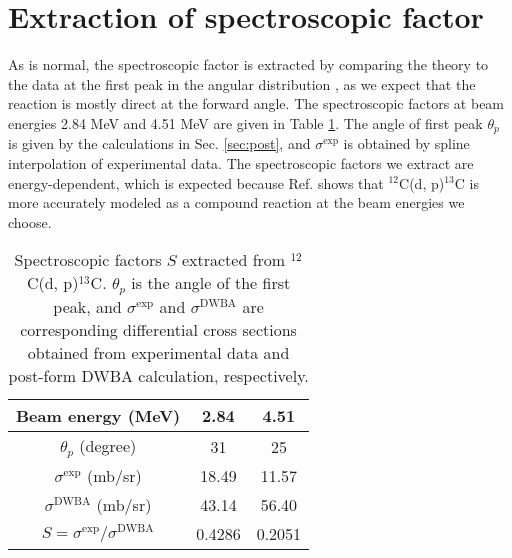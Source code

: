 \section{Extraction of spectroscopic factor}
As is normal, the spectroscopic factor is extracted by comparing the theory to the data at the first peak in the angular distribution
\cite{PhysRevC.69.064313}, as we expect that the reaction is mostly direct at the forward angle. 
The spectroscopic factors at beam energies 2.84 MeV and 4.51 MeV are given in Table \ref{tab:spec}. 
The angle of first peak $\theta_{p}$ is given by the calculations in Sec. \ref{sec:post}, 
and $\sigma^{\mathrm{exp}}$ is obtained by spline interpolation of experimental data. 
The spectroscopic factors we extract are energy-dependent, 
which is expected because Ref. \cite{PhysRev.101.209} shows that $^{12}$C(d, p)$^{13}$C is more accurately modeled as a compound reaction at the beam energies we choose. 
\begin{table}[bt]
	\centering
	\caption{Spectroscopic factors $S$ extracted from $^{12}$C(d, p)$^{13}$C. 
	$\theta_p$ is the angle of the first peak, and $\sigma^{\mathrm{exp}}$ and $\sigma^{\mathrm{DWBA}}$ are corresponding differential cross sections obtained from experimental data and post-form DWBA calculation, respectively. }
	\label{tab:spec}
	\begin{tabular}{ccc}
		\hline
		\hline
		Beam energy (MeV)                  & 2.84 & 4.51 \\
		\hline
		$\theta_p$ (degree)                &  31 & 25 \\
		$\sigma^{\mathrm{exp}}$ (mb/sr)    &  18.49 & 11.57 \\
		$\sigma^{\mathrm{DWBA}}$ (mb/sr)   &  43.14 & 56.40 \\
		$S=\sigma^{\mathrm{exp}}/\sigma^{\mathrm{DWBA}}$ & 0.4286  & 0.2051 \\
		\hline
		\hline
	\end{tabular}
\end{table}